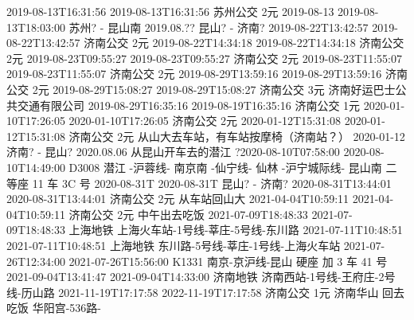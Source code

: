 2019-08-13T16:31:56 2019-08-13T16:31:56 苏州公交 2元
2019-08-13 2019-08-13T18:03:00   苏州? - 昆山南
2019.08.??       昆山? - 济南?
2019-08-22T13:42:57 2019-08-22T13:42:57 济南公交 2元
2019-08-22T14:34:18 2019-08-22T14:34:18 济南公交 2元
2019-08-23T09:55:27 2019-08-23T09:55:27 济南公交 2元
2019-08-23T11:55:07 2019-08-23T11:55:07 济南公交 2元
2019-08-29T13:59:16 2019-08-29T13:59:16 济南公交 2元
2019-08-29T15:08:27 2019-08-29T15:08:27 济南公交 3元 济南好运巴士公共交通有限公司
2019-08-29T16:35:16 2019-08-19T16:35:16 济南公交 1元
2020-01-10T17:26:05 2020-01-10T17:26:05 济南公交 2元
2020-01-12T15:31:08 2020-01-12T15:31:08 济南公交 2元 从山大去车站，有车站按摩椅（济南站？）
2020-01-12       济南? - 昆山?
2020.08.06       从昆山开车去的潜江
?2020-08-10T07:58:00 2020-08-10T14:49:00 D3008 潜江 -沪蓉线- 南京南 -仙宁线- 仙林 -沪宁城际线- 昆山南 二等座 11 车 3C 号
2020-08-31T 2020-08-31T     昆山? - 济南?
2020-08-31T13:44:01 2020-08-31T13:44:01 济南公交 2元 从车站回山大
2021-04-04T10:59:11 2021-04-04T10:59:11 济南公交 2元 中午出去吃饭
2021-07-09T18:48:33 2021-07-09T18:48:33 上海地铁 上海火车站-1号线-莘庄-5号线-东川路
2021-07-11T10:48:51 2021-07-11T10:48:51 上海地铁 东川路-5号线-莘庄-1号线-上海火车站
2021-07-26T12:34:00 2021-07-26T15:56:00 K1331 南京-京沪线-昆山 硬座 加 3 车 41 号
2021-09-04T13:41:47 2021-09-04T14:33:00 济南地铁 济南西站-1号线-王府庄-2号线-历山路
2021-11-19T17:17:58 2022-11-19T17:17:58 济南公交 1元 济南华山 回去吃饭 华阳宫-536路-
